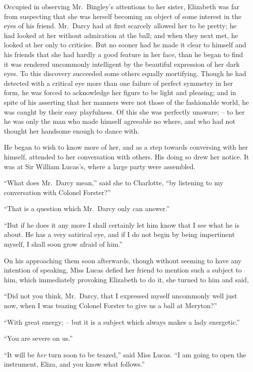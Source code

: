 Occupied in observing Mr.\ Bingley’s attentions to her
sister, Elizabeth was far from suspecting that she was
herself becoming an object of some interest in the eyes
of his friend. Mr.\ Darcy had at first scarcely allowed
her to be pretty; he had looked at her without admiration
at the ball; and when they next met, he looked at her
only to criticise. But no sooner had he made it clear to
himself and his friends that she had hardly a good feature
in her face, than he began to find it was rendered uncommonly
intelligent by the beautiful expression of her dark
eyes. To this discovery succeeded some others equally
mortifying. Though he had detected with a critical eye
more than one failure of perfect symmetry in her form,
he was forced to acknowledge her figure to be light and
pleasing; and in spite of his asserting that her manners
were not those of the fashionable world, he was caught
by their easy playfulness. Of this she was perfectly
unaware; -- to her he was only the man who made himself
agreeable no where, and who had not thought her handsome
enough to dance with.

He began to wish to know more of her, and as a step
towards conversing with her himself, attended to her
conversation with others. His doing so drew her notice.
It was at Sir William Lucas’s, where a large party were
assembled.

“What does Mr.\ Darcy mean,” said she to Charlotte,
“by listening to my conversation with Colonel Forster?”

“That is a question which Mr.\ Darcy only can answer.”

“But if he does it any more I shall certainly let him
know that I see what he is about. He has a very satirical
eye, and if I do not begin by being impertinent myself,
I shall soon grow afraid of him.”

On his approaching them soon afterwards, though
without seeming to have any intention of speaking, Miss
Lucas defied her friend to mention such a subject to him,
which immediately provoking Elizabeth to do it, she
turned to him and said,

“Did not you think, Mr.\ Darcy, that I expressed myself
uncommonly well just now, when I was teazing Colonel
Forster to give us a ball at Meryton?”

“With great energy; -- but it is a subject which always
makes a lady energetic.”

“You are severe on us.”

“It will be \textit{her} turn soon to be teazed,” said Miss
Lucas. “I am going to open the instrument, Eliza, and
you know what follows.”

